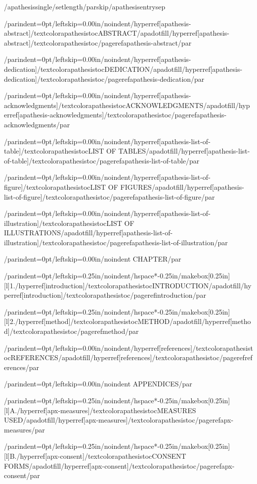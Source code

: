 {/apathesissingle/setlength{/parskip}{/apathesisentrysep}

{/parindent=0pt/leftskip=0.00in/noindent/hyperref[apathesis-abstract]{/textcolor{apathesistoc}{ABSTRACT}}/apadotfill/hyperref[apathesis-abstract]{/textcolor{apathesistoc}{/pageref{apathesis-abstract}}}/par}

{/parindent=0pt/leftskip=0.00in/noindent/hyperref[apathesis-dedication]{/textcolor{apathesistoc}{DEDICATION}}/apadotfill/hyperref[apathesis-dedication]{/textcolor{apathesistoc}{/pageref{apathesis-dedication}}}/par}

{/parindent=0pt/leftskip=0.00in/noindent/hyperref[apathesis-acknowledgments]{/textcolor{apathesistoc}{ACKNOWLEDGMENTS}}/apadotfill/hyperref[apathesis-acknowledgments]{/textcolor{apathesistoc}{/pageref{apathesis-acknowledgments}}}/par}

{/parindent=0pt/leftskip=0.00in/noindent/hyperref[apathesis-list-of-table]{/textcolor{apathesistoc}{LIST OF TABLES}}/apadotfill/hyperref[apathesis-list-of-table]{/textcolor{apathesistoc}{/pageref{apathesis-list-of-table}}}/par}

{/parindent=0pt/leftskip=0.00in/noindent/hyperref[apathesis-list-of-figure]{/textcolor{apathesistoc}{LIST OF FIGURES}}/apadotfill/hyperref[apathesis-list-of-figure]{/textcolor{apathesistoc}{/pageref{apathesis-list-of-figure}}}/par}

{/parindent=0pt/leftskip=0.00in/noindent/hyperref[apathesis-list-of-illustration]{/textcolor{apathesistoc}{LIST OF ILLUSTRATIONS}}/apadotfill/hyperref[apathesis-list-of-illustration]{/textcolor{apathesistoc}{/pageref{apathesis-list-of-illustration}}}/par}

{/parindent=0pt/leftskip=0.00in/noindent CHAPTER/par}

{/parindent=0pt/leftskip=0.25in/noindent/hspace*{-0.25in}/makebox[0.25in][l]{1.}/hyperref[introduction]{/textcolor{apathesistoc}{INTRODUCTION}}/apadotfill/hyperref[introduction]{/textcolor{apathesistoc}{/pageref{introduction}}}/par}

{/parindent=0pt/leftskip=0.25in/noindent/hspace*{-0.25in}/makebox[0.25in][l]{2.}/hyperref[method]{/textcolor{apathesistoc}{METHOD}}/apadotfill/hyperref[method]{/textcolor{apathesistoc}{/pageref{method}}}/par}

{/parindent=0pt/leftskip=0.00in/noindent/hyperref[references]{/textcolor{apathesistoc}{REFERENCES}}/apadotfill/hyperref[references]{/textcolor{apathesistoc}{/pageref{references}}}/par}

{/parindent=0pt/leftskip=0.00in/noindent APPENDICES/par}

{/parindent=0pt/leftskip=0.25in/noindent/hspace*{-0.25in}/makebox[0.25in][l]{A.}/hyperref[apx-measures]{/textcolor{apathesistoc}{MEASURES USED}}/apadotfill/hyperref[apx-measures]{/textcolor{apathesistoc}{/pageref{apx-measures}}}/par}

{/parindent=0pt/leftskip=0.25in/noindent/hspace*{-0.25in}/makebox[0.25in][l]{B.}/hyperref[apx-consent]{/textcolor{apathesistoc}{CONSENT FORMS}}/apadotfill/hyperref[apx-consent]{/textcolor{apathesistoc}{/pageref{apx-consent}}}/par}

}

